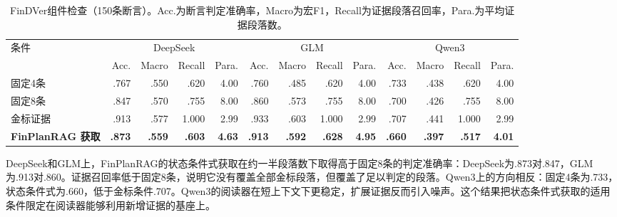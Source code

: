 \begin{table}[H]
\centering
{}
\setlength{\tabcolsep}{4pt}
\caption{FinDVer组件检查（150条断言）。Acc.为断言判定准确率，Macro为宏F1，Recall为证据段落召回率，Para.为平均证据段落数。}
\label{tab:findver-component}
\setlength{\tabcolsep}{2.2pt}
\begin{tabular}{lrrrrrrrrrrrr}
\toprule
\multirow{2}{*}{条件} & \multicolumn{4}{c}{DeepSeek} & \multicolumn{4}{c}{GLM} & \multicolumn{4}{c}{Qwen3} \\
\cmidrule(lr){2-5}\cmidrule(lr){6-9}\cmidrule(lr){10-13}
 & Acc. & Macro & Recall & Para. & Acc. & Macro & Recall & Para. & Acc. & Macro & Recall & Para. \\
\midrule
固定4条 & .767 & .550 & .620 & 4.00 & .760 & .485 & .620 & 4.00 & .733 & .438 & .620 & 4.00 \\
固定8条 & .847 & .570 & .755 & 8.00 & .860 & .573 & .755 & 8.00 & .700 & .426 & .755 & 8.00 \\
金标证据 & .913 & .577 & 1.000 & 2.99 & .933 & .603 & 1.000 & 2.99 & .707 & .441 & 1.000 & 2.99 \\
\textbf{FinPlanRAG 获取} & \textbf{.873} & \textbf{.559} & \textbf{.603} & \textbf{4.63} & \textbf{.913} & \textbf{.592} & \textbf{.628} & \textbf{4.95} & \textbf{.660} & \textbf{.397} & \textbf{.517} & \textbf{4.01} \\
\bottomrule
\end{tabular}
\end{table}

DeepSeek和GLM上，FinPlanRAG的状态条件式获取在约一半段落数下取得高于固定8条的判定准确率：DeepSeek为.873对.847，GLM为.913对.860。证据召回率低于固定8条，说明它没有覆盖全部金标段落，但覆盖了足以判定的段落。Qwen3上的方向相反：固定4条为.733，状态条件式为.660，低于金标条件.707。Qwen3的阅读器在短上下文下更稳定，扩展证据反而引入噪声。这个结果把状态条件式获取的适用条件限定在阅读器能够利用新增证据的基座上。

